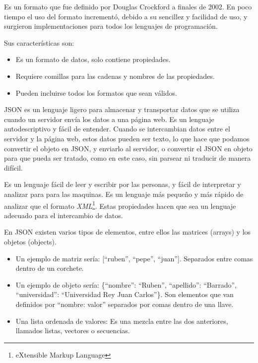 \documentclass[a4paper, 12pt]{book}
\begin{document}
\vspace{5mm}
Es un formato que fue definido por Douglas Crockford a finales de 2002. En poco tiempo el uso del formato incrementó, debido a su sencillez y facilidad de uso, y surgieron implementaciones para todos los lenguajes de programación. 

\vspace{5mm}
Sus características son:

\begin{itemize}
\item Es un formato de datos, solo contiene propiedades.
\item Requiere comillas para las cadenas y nombres de las propiedades.
\item Pueden incluirse todos los formatos que sean válidos.
\end{itemize}

\vspace{5mm}
JSON es un lenguaje ligero para almacenar y transportar datos que se utiliza cuando un servidor envía los datos a una página web. Es un lenguaje autodescriptivo y fácil de entender. Cuando se intercambian datos entre el servidor y la página web, estos datos pueden ser texto, lo que hace que podamos convertir el objeto en JSON, y enviarlo al servidor, o convertir el JSON en objeto para que pueda ser tratado, como en este caso, sin parsear ni traducir de manera difícil.

Es un lenguaje fácil de leer y escribir por las personas, y fácil de interpretar y analizar para para las maquinas. Es un lenguaje más pequeño y más rápido de analizar que el formato \textit{XML}\footnote{eXtensible Markup Language}. Estas propiedades hacen que sea un lenguaje adecuado para el intercambio de datos. 

\vspace{5mm}
En JSON existen varios tipos de elementos, entre ellos las matrices (arrays) y los objetos (objects). 
\begin{itemize}
\item Un ejemplo de matriz sería: [“ruben”, “pepe”, “juan”]. Separados entre comas dentro de un corchete.
\item Un ejemplo de objeto sería: \{“nombre”: “Ruben”, “apellido”: “Barrado”, “universidad”: “Universidad Rey Juan Carlos”\}. Son elementos que van definidos por “nombre: valor” separados por comas dentro de una llave.
\item Una lista ordenada de valores: Es una mezcla entre las dos anteriores, llamados listas, vectores o secuencias. 
\end{itemize}
\end{document}
